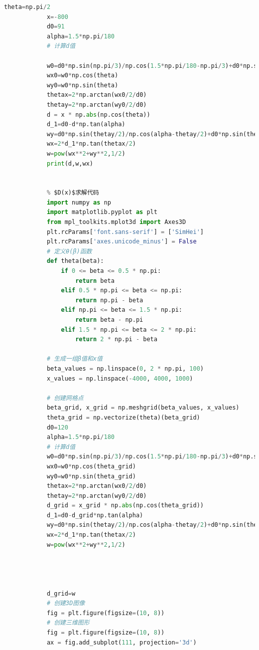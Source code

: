\documentclass[withoutpreface,bwprint]{cumcmthesis} %
\begin{document}
\begin{appendices}
\begin{lstlisting}[language=Python]
            theta=np.pi/2
            x=-800
            d0=91
            alpha=1.5*np.pi/180
            # 计算d值

            w0=d0*np.sin(np.pi/3)/np.cos(1.5*np.pi/180-np.pi/3)+d0*np.sin(np.pi/3)/np.cos(1.5*np.pi/180+np.pi/3)
            wx0=w0*np.cos(theta)
            wy0=w0*np.sin(theta)
            thetax=2*np.arctan(wx0/2/d0)
            thetay=2*np.arctan(wy0/2/d0)
            d = x * np.abs(np.cos(theta))
            d_1=d0-d*np.tan(alpha)
            wy=d0*np.sin(thetay/2)/np.cos(alpha-thetay/2)+d0*np.sin(thetay/2)/np.cos(alpha+thetay/2)
            wx=2*d_1*np.tan(thetax/2)
            w=pow(wx**2+wy**2,1/2)
            print(d,w,wx)


            % $D(x)$求解代码
            import numpy as np
            import matplotlib.pyplot as plt
            from mpl_toolkits.mplot3d import Axes3D
            plt.rcParams['font.sans-serif'] = ['SimHei']
            plt.rcParams['axes.unicode_minus'] = False
            # 定义θ(β)函数
            def theta(beta):
                if 0 <= beta <= 0.5 * np.pi:
                    return beta
                elif 0.5 * np.pi <= beta <= np.pi:
                    return np.pi - beta
                elif np.pi <= beta <= 1.5 * np.pi:
                    return beta - np.pi
                elif 1.5 * np.pi <= beta <= 2 * np.pi:
                    return 2 * np.pi - beta

            # 生成一组β值和x值
            beta_values = np.linspace(0, 2 * np.pi, 100)
            x_values = np.linspace(-4000, 4000, 1000)

            # 创建网格点
            beta_grid, x_grid = np.meshgrid(beta_values, x_values)
            theta_grid = np.vectorize(theta)(beta_grid)
            d0=120
            alpha=1.5*np.pi/180
            # 计算d值
            w0=d0*np.sin(np.pi/3)/np.cos(1.5*np.pi/180-np.pi/3)+d0*np.sin(np.pi/3)/np.cos(1.5*np.pi/180+np.pi/3)
            wx0=w0*np.cos(theta_grid)
            wy0=w0*np.sin(theta_grid)
            thetax=2*np.arctan(wx0/2/d0)
            thetay=2*np.arctan(wy0/2/d0)
            d_grid = x_grid * np.abs(np.cos(theta_grid))
            d_1=d0-d_grid*np.tan(alpha)
            wy=d0*np.sin(thetay/2)/np.cos(alpha-thetay/2)+d0*np.sin(thetay/2)/np.cos(alpha+thetay/2)
            wx=2*d_1*np.tan(thetax/2)
            w=pow(wx**2+wy**2,1/2)




            d_grid=w
            # 创建3D图像
            fig = plt.figure(figsize=(10, 8))
            # 创建三维图形
            fig = plt.figure(figsize=(10, 8))
            ax = fig.add_subplot(111, projection='3d')




\end{lstlisting}
\end{appendices}
\end{document}
